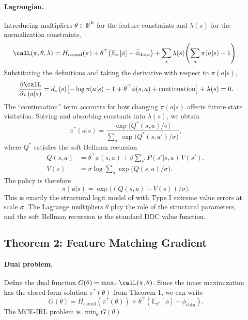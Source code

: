 \documentclass[10pt]{article}
\newcommand{\E}{\mathbb{E}}
\newcommand{\R}{\mathbb{R}}
\begin{document}
\paragraph{Lagrangian.}
Introducing multipliers $\theta \in \R^K$ for the feature constraints and $\lambda(s)$ for the normalization constraints,
\begin{equation}
\calL(\pi, \theta, \lambda) = H_{\text{causal}}(\pi) + \theta^\top\!\left(\E_\pi[\phi] - \bar\phi_{\text{data}}\right) + \sum_s \lambda(s)\!\left(\sum_a \pi(a|s) - 1\right).
\end{equation}
Substituting the definitions and taking the derivative with respect to $\pi(a|s)$,
\begin{equation}
\frac{\partial \calL}{\partial \pi(a|s)} = d_\pi(s)\!\left[-\log \pi(a|s) - 1 + \theta^\top \phi(s,a) + \text{continuation}\right] + \lambda(s) = 0.
\end{equation}
The ``continuation'' term accounts for how changing $\pi(a|s)$ affects future state visitation. Solving and absorbing constants into $\lambda(s)$, we obtain
\begin{equation}
\pi^*(a|s) = \frac{\exp\!\bigl(Q^*(s,a)/\sigma\bigr)}{\sum_{a'} \exp\!\bigl(Q^*(s,a')/\sigma\bigr)},
\end{equation}
where $Q^*$ satisfies the soft Bellman recursion
\begin{align}
Q(s,a) &= \theta^\top \phi(s,a) + \beta \sum_{s'} P(s'|s,a)\, V(s'), \label{eq:soft_q} \\
V(s) &= \sigma \log \sum_{a} \exp\bigl(Q(s,a)/\sigma\bigr). \label{eq:soft_v}
\end{align}
The policy is therefore
\begin{equation}
\label{eq:soft_pi}
\pi(a|s) = \exp\!\bigl((Q(s,a) - V(s))/\sigma\bigr).
\end{equation}
This is exactly the structural logit model of \citet{rust1987} with Type I extreme value errors at scale $\sigma$. The Lagrange multipliers $\theta$ play the role of the structural parameters, and the soft Bellman recursion is the standard DDC value function.


\subsection{Theorem 2: Feature Matching Gradient}

\paragraph{Dual problem.}
Define the dual function $G(\theta) = \max_\pi \calL(\pi, \theta)$. Since the inner maximization has the closed-form solution $\pi^*(\theta)$ from Theorem 1, we can write
\begin{equation}
G(\theta) = H_{\text{causal}}(\pi^*(\theta)) + \theta^\top\!\left(\E_{\pi^*}[\phi] - \bar\phi_{\text{data}}\right).
\end{equation}
The MCE-IRL problem is $\min_\theta G(\theta)$.
\end{document}
